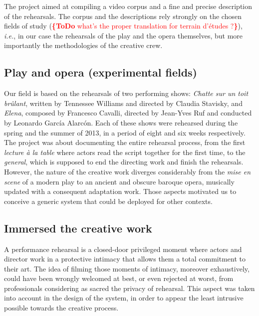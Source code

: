 \documentclass[conference]{IEEEtran}
\newcommand{\todo}[1]{\noindent\textcolor{red}{{\bf \{ToDo} #1{\bf \}}}}
\begin{document}
The project aimed at compiling a video corpus and a fine and precise description of the rehearsals. The corpus and the descriptions rely strongly on the chosen fields of study (\todo{what's the proper translation for terrain d'études ?}), \emph{i.e.}, in our case the rehearsals of the play and the opera themselves, but more importantly the methodologies of the creative crew.

\subsection{Play and opera (experimental fields)}

Our field is based on the rehearsals of two performing shows: \emph{Chatte sur un toit brûlant}, written by Tennessee Williams and directed by Claudia Stavisky, and \emph{Elena}, composed by Francesco Cavalli, directed by Jean-Yves Ruf and conducted by Leonardo García Alarcón.
Each of these shows were rehearsed during the spring and the summer of 2013, in a period of eight and six weeks respectively. The project was about documenting the entire rehearsal process, from the first \emph{lecture à la table} where actors read the script together for the first time, to the \emph{general}, which is supposed to end the directing work and finish the rehearsals.
However, the nature of the creative work diverges considerably from the \emph{mise en scene} of a modern play to an ancient and obscure baroque opera, musically updated with a consequent adaptation work.
Those aspects motivated us to conceive a generic system that could be deployed for other contexts.

\subsection{Immersed the creative work}

A performance rehearsal is a closed-door privileged moment where actors and director work in a protective intimacy that allows them a total commitment to their art. The idea of filming those moments of intimacy, moreover exhaustively, could have been wrongly welcomed at best, or even rejected at worst, from professionals considering as sacred the privacy of rehearsal.
This aspect was taken into account in the design of the system, in order to appear the least intrusive possible towards the creative process.
\end{document}
